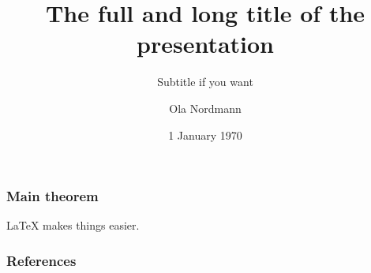 \documentclass[screen, aspectratio=43]{beamer}
\title[Short title]{The full and long title of the presentation}
\subtitle{Subtitle if you want}
\author[O. Nordmann]{Ola Nordmann}
\institute[NTNU]{Department of LaTeX-ical sciences, NTNU}
\date{1 January 1970}
\begin{document}
\ntnutitlepage

\begin{frame}
  \frametitle{Main theorem}
  \begin{theorem}
    LaTeX makes things easier\cite{latex}.
  \end{theorem}
\end{frame}


\begin{frame}
  \frametitle{References}
  \printbibliography
\end{frame}
\end{document}
